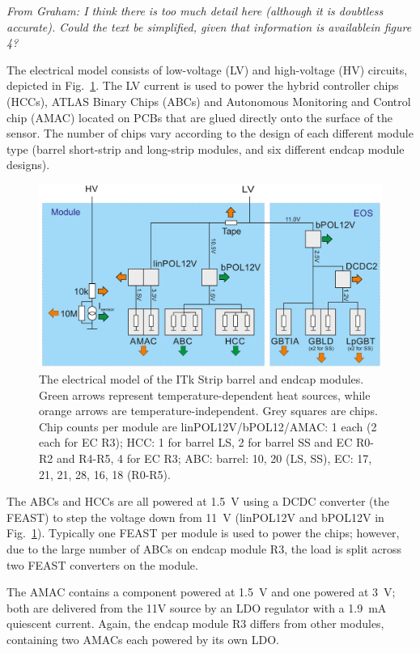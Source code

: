 \textit{From Graham: I think there is too much detail here (although it is doubtless accurate). Could the text be simplified, given that information is availablein figure 4?}

The electrical model consists of low-voltage (LV) and high-voltage (HV) circuits, depicted in
Fig.~\ref{electrical_model}. The LV current is used to power the hybrid controller chips (HCCs),
ATLAS Binary Chips (ABCs) and Autonomous Monitoring and Control chip (AMAC) located on PCBs that are
glued directly onto the surface of the sensor. The number of chips vary according to the design of
each different module type (barrel short-strip and long-strip modules, and six different endcap
module designs).

\begin{figure}[ht!]
\centering
\includegraphics[width=0.8\linewidth]{figures/electrical_model.pdf}
\caption{
The electrical model of the ITk Strip barrel and endcap modules. Green arrows represent temperature-dependent heat sources, while orange arrows are temperature-independent. Grey squares are chips. Chip counts per module are linPOL12V/bPOL12/AMAC: 1 each (2 each for EC R3); HCC: 1 for barrel LS, 2 for barrel SS and EC R0-R2 and R4-R5, 4 for EC R3; ABC: barrel: 10, 20 (LS, SS), EC: 17, 21, 21, 28, 16, 18 (R0-R5).
}
\label{electrical_model}
\end{figure}

The ABCs and HCCs are all powered at 1.5~V using a DCDC converter (the FEAST) to step the voltage down
from 11~V (linPOL12V and bPOL12V in Fig.~\ref{electrical_model}). Typically one FEAST per module is used to power the chips; however, due to the large
number of ABCs on endcap module R3, the load is split across two FEAST converters on the module.

The AMAC contains a component powered at 1.5~V and one powered at 3~V; both are delivered from the
11V source by an LDO regulator with a 1.9~mA quiescent current.
Again, the endcap module R3 differs from other modules, containing two AMACs each powered by its own
LDO.

